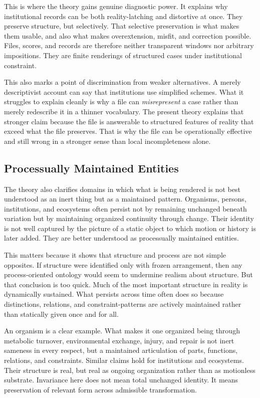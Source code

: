 \documentclass[11pt]{article}
\renewcommand{\emph}[1]{\textit{#1}}
\begin{document}
This is where the theory gains genuine diagnostic power. It explains why institutional records can be both reality-latching and distortive at once. They preserve structure, but selectively. That selective preservation is what makes them usable, and also what makes overextension, misfit, and correction possible. Files, scores, and records are therefore neither transparent windows nor arbitrary impositions. They are finite renderings of structured cases under institutional constraint.

This also marks a point of discrimination from weaker alternatives. A merely descriptivist account can say that institutions use simplified schemes. What it struggles to explain cleanly is why a file can \emph{misrepresent} a case rather than merely redescribe it in a thinner vocabulary. The present theory explains that stronger claim because the file is answerable to structured features of reality that exceed what the file preserves. That is why the file can be operationally effective and still wrong in a stronger sense than local incompleteness alone.

\subsection{Processually Maintained Entities}

The theory also clarifies domains in which what is being rendered is not best understood as an inert thing but as a maintained pattern. Organisms, persons, institutions, and ecosystems often persist not by remaining unchanged beneath variation but by maintaining organized continuity through change. \cite{Whitehead1978ProcessReality,Rescher1996ProcessMetaphysics,TognoliKelso2014MetastableBrain} Their identity is not well captured by the picture of a static object to which motion or history is later added. They are better understood as processually maintained entities.

This matters because it shows that structure and process are not simple opposites. If structure were identified only with frozen arrangement, then any process-oriented ontology would seem to undermine realism about structure. But that conclusion is too quick. Much of the most important structure in reality is dynamically sustained. What persists across time often does so because distinctions, relations, and constraint-patterns are actively maintained rather than statically given once and for all.

An organism is a clear example. What makes it one organized being through metabolic turnover, environmental exchange, injury, and repair is not inert sameness in every respect, but a maintained articulation of parts, functions, relations, and constraints. Similar claims hold for institutions and ecosystems. Their structure is real, but real as ongoing organization rather than as motionless substrate. Invariance here does not mean total unchanged identity. It means preservation of relevant form across admissible transformation.
\end{document}
